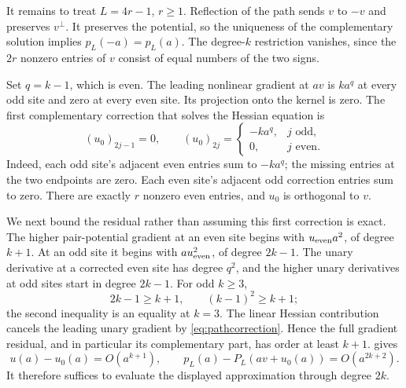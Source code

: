It remains to treat $L=4r-1$, $r\geq1$. Reflection of the path sends
$v$ to $-v$ and preserves $v^\perp$. It preserves the potential, so the
uniqueness of the complementary solution implies $p_L(-a)=p_L(a)$.
The degree-$k$ restriction vanishes, since the $2r$ nonzero entries
of $v$ consist of equal numbers of the two signs.

Set $q=k-1$, which is even. The leading nonlinear gradient at $av$ is
$ka^q$ at every odd site and zero at every even site. Its projection
onto the kernel is zero. The first complementary correction that solves
the Hessian equation is
\begin{equation}\label{eq:pathcorrection}
 (u_0)_{2j-1}=0,\qquad
 (u_0)_{2j}=
 \begin{cases}
  -ka^q,&j\text{ odd},\\
  0,&j\text{ even}.
 \end{cases}
\end{equation}
Indeed, each odd site's adjacent even entries sum to $-ka^q$; the
missing entries at the two endpoints are zero. Each even site's adjacent
odd correction entries sum to zero. There are exactly $r$ nonzero even
entries, and $u_0$ is orthogonal to $v$.

We next bound the residual rather than assuming this first correction is
exact. The higher pair-potential gradient at an even site begins with
$u_{\rm even}a^2$, of degree $k+1$. At an odd site it begins with
$a u_{\rm even}^2$, of degree $2k-1$. The unary derivative at a corrected
even site has degree $q^2$, and the higher unary derivatives at odd sites
start in degree $2k-1$. For odd $k\geq3$,
\begin{equation}\label{eq:residualinequalities}
 2k-1\geq k+1,\qquad (k-1)^2\geq k+1;
\end{equation}
the second inequality is an equality at $k=3$.
The linear Hessian contribution cancels the leading unary gradient by
\eqref{eq:pathcorrection}. Hence the full gradient residual, and in
particular its complementary part, has order at least $k+1$.
 gives
\begin{equation}\label{eq:patherror}
 u(a)-u_0(a)=O(a^{k+1}),\qquad
 p_L(a)-P_L(av+u_0(a))=O(a^{2k+2}).
\end{equation}
It therefore suffices to evaluate the displayed approximation through
degree $2k$.

